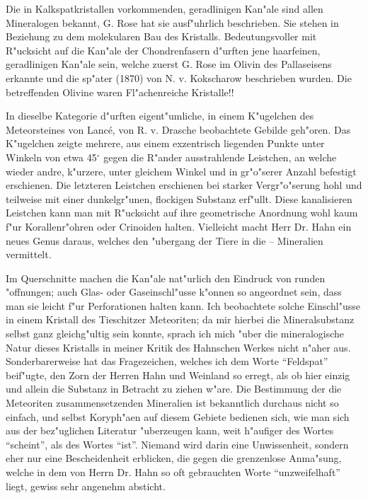 \documentclass[a4paper, 12pt, oneside]{article}
\begin{document}
Die in Kalkspatkristallen vorkommenden, geradlinigen Kan"ale sind allen Mineralogen bekannt, G. Rose hat sie ausf"uhrlich beschrieben. Sie stehen in Beziehung zu dem molekularen Bau des Kristalls. Bedeutungsvoller mit R"ucksicht auf die Kan"ale der Chondrenfasern d"urften jene haarfeinen, geradlinigen Kan"ale sein, welche zuerst G. Rose im Olivin des Pallaseisens erkannte und die sp"ater (1870) von N. v. Kokscharow beschrieben wurden. Die betreffenden Olivine waren Fl"achenreiche Kristalle!!

In dieselbe Kategorie d"urften eigent"umliche, in einem K"ugelchen des Meteorsteines von Lancé, von R. v. Drasche beobachtete Gebilde geh"oren. Das K"ugelchen zeigte mehrere, aus einem exzentrisch liegenden Punkte unter Winkeln von etwa 45$^{\circ}$ gegen die R"ander ausstrahlende Leistchen, an welche wieder andre, k"urzere, unter gleichem Winkel und in gr"o"serer Anzahl befestigt erschienen. Die letzteren Leistchen erschienen bei starker Vergr"o"serung hohl und teilweise mit einer dunkelgr"unen, flockigen Substanz erf"ullt. Diese kanalisieren Leistchen kann man mit R"ucksicht auf ihre geometrische Anordnung wohl kaum f"ur Korallenr"ohren oder Crinoiden halten. Vielleicht macht Herr Dr. Hahn ein neues Genus daraus, welches den "ubergang der Tiere in die – Mineralien vermittelt.

Im Querschnitte machen die Kan"ale nat"urlich den Eindruck von runden "offnungen; auch Glas- oder Gaseinschl"usse k"onnen so angeordnet sein, dass man sie leicht f"ur Perforationen halten kann. Ich beobachtete solche Einschl"usse in einem Kristall des Tieschitzer Meteoriten; da mir hierbei die Mineralsubstanz selbst ganz gleichg"ultig sein konnte, sprach ich mich "uber die mineralogische Natur dieses Kristalls in meiner Kritik des Hahnschen Werkes nicht n"aher aus. Sonderbarerweise hat das Fragezeichen, welches ich dem Worte "`Feldspat"' beif"ugte, den Zorn der Herren Hahn und Weinland so erregt, als ob hier einzig und allein die Substanz in Betracht zu ziehen w"are. Die Bestimmung der die Meteoriten zusammensetzenden Mineralien ist bekanntlich durchaus nicht so einfach, und selbst Koryph"aen auf diesem Gebiete bedienen sich, wie man sich aus der bez"uglichen Literatur "uberzeugen kann, weit h"aufiger des Wortes "`scheint"', als des Wortes "`ist"'. Niemand wird darin eine Unwissenheit, sondern eher nur eine Bescheidenheit erblicken, die gegen die grenzenlose Anma"sung, welche in dem von Herrn Dr. Hahn so oft gebrauchten Worte "`unzweifelhaft"' liegt, gewiss sehr angenehm absticht.
\end{document}

